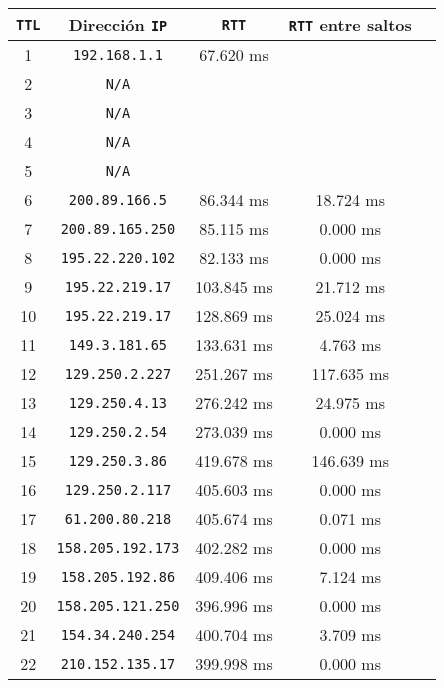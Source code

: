 \renewcommand{\arraystretch}{1.5}
\begin{tabular}{|c|c|c|c|c|} \hline
\texttt{TTL} & Dirección \texttt{IP} & \texttt{RTT} & \texttt{RTT} entre saltos \\ \hline
 1 & \texttt{192.168.1.1}     &   67.620 ms &            \\
 2 & \texttt{N/A}             &             &            \\
 3 & \texttt{N/A}             &             &            \\
 4 & \texttt{N/A}             &             &            \\
 5 & \texttt{N/A}             &             &            \\
 6 & \texttt{200.89.166.5}    &   86.344 ms &  18.724 ms \\
 7 & \texttt{200.89.165.250}  &   85.115 ms &   0.000 ms \\
 8 & \texttt{195.22.220.102}  &   82.133 ms &   0.000 ms \\
 9 & \texttt{195.22.219.17}   &  103.845 ms &  21.712 ms \\
10 & \texttt{195.22.219.17}   &  128.869 ms &  25.024 ms \\
11 & \texttt{149.3.181.65}    &  133.631 ms &   4.763 ms \\
12 & \texttt{129.250.2.227}   &  251.267 ms & 117.635 ms \\
13 & \texttt{129.250.4.13}    &  276.242 ms &  24.975 ms \\
14 & \texttt{129.250.2.54}    &  273.039 ms &   0.000 ms \\
15 & \texttt{129.250.3.86}    &  419.678 ms & 146.639 ms \\
16 & \texttt{129.250.2.117}   &  405.603 ms &   0.000 ms \\
17 & \texttt{61.200.80.218}   &  405.674 ms &   0.071 ms \\
18 & \texttt{158.205.192.173} &  402.282 ms &   0.000 ms \\
19 & \texttt{158.205.192.86}  &  409.406 ms &   7.124 ms \\
20 & \texttt{158.205.121.250} &  396.996 ms &   0.000 ms \\
21 & \texttt{154.34.240.254}  &  400.704 ms &   3.709 ms \\
22 & \texttt{210.152.135.17}  &  399.998 ms &   0.000 ms \\
\hline
\end{tabular}
